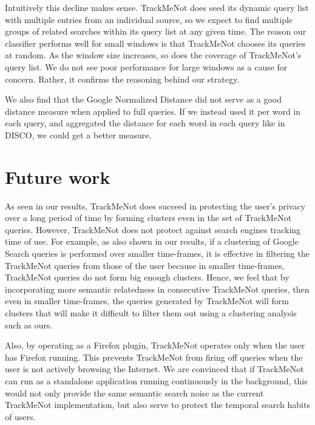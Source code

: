 \documentclass{llncs}
\begin{document}
\begin{multicols}{2}
Intuitively this decline makes sense.  TrackMeNot does seed its
dynamic query list with multiple entries from an individual source, so
we expect to find multiple groups of related searches within its query
list at any given time. The reason our classifier performs well for
small windows is that TrackMeNot chooses its queries at random. As the
window size increases, so does the coverage of TrackMeNot's query
list. We do not see poor performance for large windows as a cause for
concern. Rather, it confirms the reasoning behind our strategy.


We also find that the Google Normalized Distance did not serve as a good
distance measure when applied to full queries. If we instead used it
per word in each query, and aggregated the distance for each word in
each query like in DISCO, we could get a better measure.

\section{Future work}
\label{sec:future}
As seen in our results, TrackMeNot does succeed in protecting the
user's privacy over a long period of time by forming clusters even in
the set of TrackMeNot queries. However, TrackMeNot does not protect
against search engines tracking time of use. For example, as also
shown in our results, if a clustering of Google Search queries is
performed over smaller time-frames, it is effective in filtering
the TrackMeNot queries from those of the user because in smaller
time-frames, TrackMeNot queries do not form big enough
clusters. Hence, we feel that by incorporating more semantic
relatedness in consecutive TrackMeNot queries, then even in smaller time-frames, the
queries generated by TrackMeNot will form clusters that will make it
difficult to filter them out using a clustering analysis such as ours.

Also, by operating as a Firefox plugin, TrackMeNot operates only when
the user has Firefox running. This prevents TrackMeNot from firing off
queries when the user is not actively browsing the Internet. We are
convinced that if TrackMeNot can run as a standalone application
running continuously in the background, this would not only provide
the same semantic search noise as the current TrackMeNot
implementation, but also serve to protect the temporal search habits
of users.



\end{multicols}
\newpage
\end{document}
